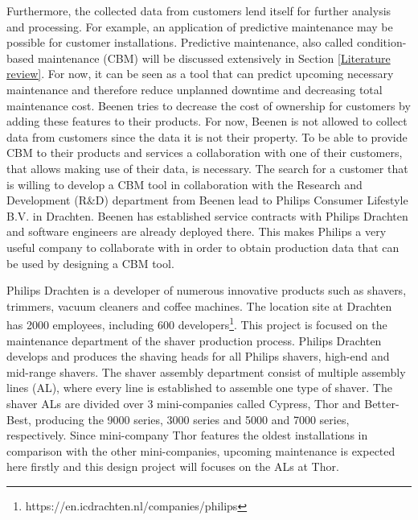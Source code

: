 Furthermore, the collected data from customers lend itself for further analysis and processing. For example, an application of predictive maintenance may be possible for customer installations. Predictive maintenance, also called condition-based maintenance (CBM) will be discussed extensively in Section \ref{Literature review}. For now, it can be seen as a tool that can predict upcoming necessary maintenance and therefore reduce unplanned downtime and decreasing total maintenance cost. Beenen tries to decrease the cost of ownership for customers by adding these features to their products. For now, Beenen is not allowed to collect data from customers since the data it is not their property. To be able to provide CBM to their products and services a collaboration with one of their customers, that allows making use of their data, is necessary. The search for a customer that is willing to develop a CBM tool in collaboration with the Research and Development (R\&D) department from Beenen lead to Philips Consumer Lifestyle B.V. in Drachten. Beenen has  established service contracts with Philips Drachten and software engineers are already deployed there. This makes Philips a very useful company to collaborate with in order to obtain production data that can be used by designing a CBM tool. 

Philips Drachten is a developer of numerous innovative products such as shavers, trimmers, vacuum cleaners and coffee machines. The location site at Drachten has 2000 employees, including 600 developers\footnote{https://en.icdrachten.nl/companies/philips}. This project is focused on the maintenance department of the shaver production process. Philips Drachten develops and produces the shaving heads for all Philips shavers, high-end and mid-range shavers. The shaver assembly department consist of multiple assembly lines (AL), where every line is established to assemble one type of shaver. The shaver ALs are divided over 3 mini-companies called Cypress, Thor and Better-Best, producing the 9000 series, 3000 series and 5000 and 7000 series, respectively. Since mini-company Thor features the oldest installations in comparison with the other mini-companies, upcoming maintenance is expected here firstly and this design project will focuses on the ALs at Thor.

